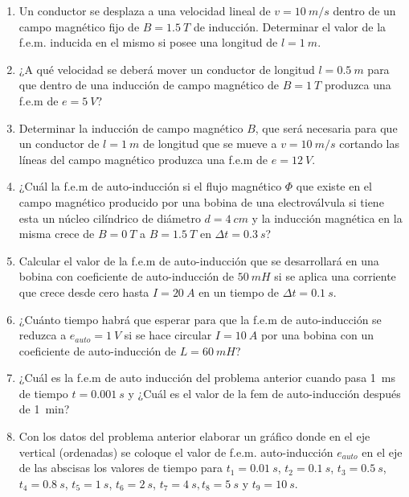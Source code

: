 \documentclass[../main]{subfiles}
\begin{document}
\begin{enumerate}
  \item Un conductor se desplaza a una velocidad lineal de $v=\qty{10}{m/s}$ dentro de un campo magn\'etico fijo de $B=\qty{1,5}{T}$ de inducci\'on. Determinar el valor de la f.e.m. inducida en el mismo si posee una longitud de $l=\qty{1}{m}$.

  \item ¿A qu\'e velocidad se deber\'a mover un conductor de longitud $l=\qty{0,5}{m}$ para que dentro de una inducci\'on de campo magn\'etico de $B=\qty{1}{T}$ produzca una f.e.m de $e=\qty{5}{V}$?

  \item Determinar la inducci\'on de campo magn\'etico $B$, que ser\'a necesaria para que un conductor de $l=\qty{1}{m}$ de longitud que se mueve a $v=\qty{10}{m/s}$ cortando las l\'ineas del campo magn\'etico produzca una f.e.m de $e=\qty{12}{V}$.

  \item ¿Cu\'al la f.e.m de auto-inducci\'on si el flujo magn\'etico $\Phi$ que existe en el campo magn\'etico producido por una bobina de una electrov\'alvula si tiene esta un n\'ucleo cil\'indrico de di\'ametro $d=\qty{4}{cm}$ y la inducci\'on magn\'etica en la misma crece de $B=\qty{0}{T}$ a $B=\qty{1,5}{T}$ en $\Delta t=\qty{0,3}{s}$?

  \item Calcular el valor de la f.e.m de auto-inducci\'on que se desarrollar\'a en una bobina con coeficiente de auto-inducci\'on de $\qty{50}{mH}$ si se aplica una corriente que crece desde cero hasta $I=\qty{20}{A}$ en un tiempo de $\Delta t=\qty{0,1}{s}$.

  \item ¿Cu\'anto tiempo habr\'a que esperar para que la f.e.m de auto-inducci\'on se reduzca a $e_{auto}=\qty{1}{V}$ si se hace circular $I=\qty{10}{A}$ por una bobina con un coeficiente de auto-inducci\'on de $L=\qty{60}{mH}$?

  \item ¿Cu\'al es la f.e.m de auto inducci\'on del problema anterior cuando pasa \qty{1}{ms} de tiempo $t=\qty{0,001}{s}$ y ¿Cu\'al es el valor de la fem de auto-inducci\'on despu\'es de \qty{1}{min}?

  \item Con los datos del problema anterior elaborar un gr\'afico donde en el eje vertical (ordenadas) se coloque el valor de f.e.m. auto-inducci\'on $e_{auto}$ en el eje de las abscisas los valores de tiempo para $t_1=\qty{0,01}{s}$, $t_2=\qty{0,1}{s}$, $t_3=\qty{0,5}{s}$, $t_4=\qty{0,8}{s}$, $t_5=\qty{1}{s}$, $t_6=\qty{2}{s}$, $t_7=\qty{4}{s}, t_8=\qty{5}{s}$ y $t_9=\qty{10}{s}$.


\end{enumerate}
\end{document}
